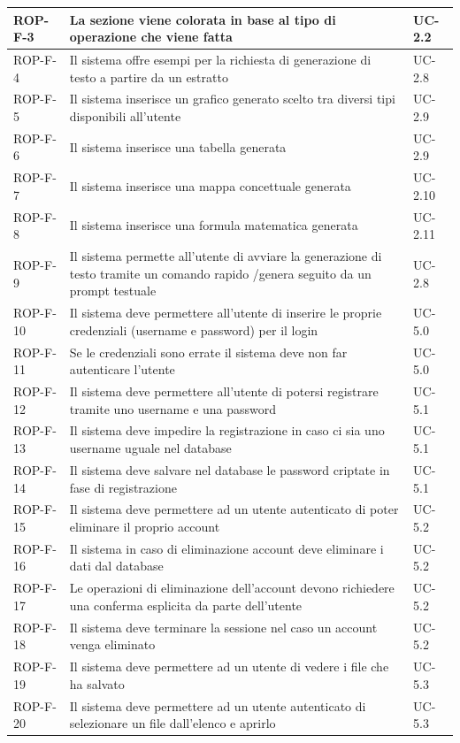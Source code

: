\documentclass[11pt,a4paper]{article}
\begin{document}
\begin{longtable}{|p{}|>{\raggedright\arraybackslash}p{}|p{}|}
\hline
ROP-F-3 & La sezione viene colorata in base al tipo di operazione che viene fatta & UC-2.2 \\
\hline
ROP-F-4 & Il sistema offre esempi per la richiesta di generazione di testo a partire da un estratto & UC-2.8 \\
\hline
ROP-F-5 & Il sistema inserisce un grafico generato scelto tra diversi tipi disponibili all'utente & UC-2.9 \\
\hline
ROP-F-6 & Il sistema inserisce una tabella generata & UC-2.9 \\
\hline
ROP-F-7 & Il sistema inserisce una mappa concettuale generata & UC-2.10 \\
\hline
ROP-F-8 & Il sistema inserisce una formula matematica generata & UC-2.11 \\
\hline
ROP-F-9 & Il sistema permette all'utente di avviare la generazione di testo tramite un comando rapido /genera seguito da un prompt testuale & UC-2.8 \\
\hline
ROP-F-10 & Il sistema deve permettere all'utente di inserire le proprie credenziali (username e password) per il login & UC-5.0 \\
\hline
ROP-F-11 & Se le credenziali sono errate il sistema deve non far autenticare l'utente & UC-5.0 \\
\hline
ROP-F-12 & Il sistema deve permettere all'utente di potersi registrare tramite uno username e una password & UC-5.1 \\
\hline
ROP-F-13 & Il sistema deve impedire la registrazione in caso ci sia uno username uguale nel database & UC-5.1 \\
\hline
ROP-F-14 & Il sistema deve salvare nel database le password criptate in fase di registrazione & UC-5.1 \\
\hline
ROP-F-15 & Il sistema deve permettere ad un utente autenticato di poter eliminare il proprio account & UC-5.2 \\
\hline
ROP-F-16 & Il sistema in caso di eliminazione account deve eliminare i dati dal database & UC-5.2 \\
\hline
ROP-F-17 & Le operazioni di eliminazione dell'account devono richiedere una conferma esplicita da parte dell'utente & UC-5.2 \\
\hline
ROP-F-18 & Il sistema deve terminare la sessione nel caso un account venga eliminato & UC-5.2 \\
\hline
ROP-F-19 & Il sistema deve permettere ad un utente di vedere i file che ha salvato & UC-5.3 \\
\hline
ROP-F-20 & Il sistema deve permettere ad un utente autenticato di selezionare un file dall'elenco e aprirlo & UC-5.3 \\

\end{longtable}
\end{document}
